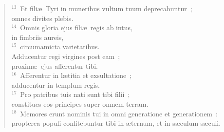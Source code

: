 \begin{flushleft}
\begin{verse}
${}^{13}$~Et fili\ae\ Tyri in muneribus vultum tuum deprecabuntur~;\\ omnes divites plebis.\\
${}^{14}$~Omnis gloria ejus fili\ae\ regis ab intus,\\ in fimbriis aureis,\\
${}^{15}$~circumamicta varietatibus.\\ Adducentur regi virgines post eam~;\\ proxim\ae\ ejus afferentur tibi.\\
${}^{16}$~Afferentur in l\ae titia et exsultatione~;\\ adducentur in templum regis.\\
${}^{17}$~Pro patribus tuis nati sunt tibi filii~;\\ constitues eos principes super omnem terram.\\
${}^{18}$~Memores erunt nominis tui in omni generatione et generationem~:\\ propterea populi confitebuntur tibi in \ae ternum, et in s\ae culum s\ae culi.\end{verse}\end{flushleft}



